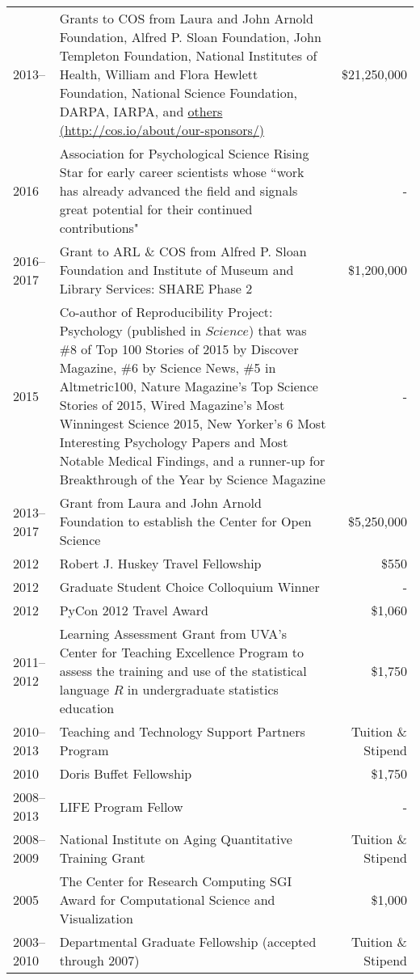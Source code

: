 \documentclass[11pt]{article}
\begin{document}
\begin{tabularx}{\textwidth}{lXr}
2013-- 			& Grants to COS from Laura and John Arnold Foundation, Alfred P. Sloan Foundation, John Templeton Foundation, National Institutes of Health, William and Flora Hewlett Foundation, National Science Foundation, DARPA, IARPA, and \href{http://cos.io/about/our-sponsors/}{others (http://cos.io/about/our-sponsors/)} & \$21,250,000 \\
2016			& Association for Psychological Science Rising Star for early career scientists whose ``work has already advanced the field and signals great potential for their continued contributions" & - \\
2016--2017		& Grant to ARL \& COS from Alfred P. Sloan Foundation and Institute of Museum and Library Services: SHARE Phase 2 & \$1,200,000 \\
2015 			& Co-author of Reproducibility Project: Psychology (published in $Science$) that was \#8 of Top 100 Stories of 2015 by Discover Magazine, \#6 by Science News, \#5 in Altmetric100, Nature Magazine’s Top Science Stories of 2015,  Wired Magazine’s Most Winningest Science 2015, New Yorker’s 6 Most Interesting Psychology Papers and Most Notable Medical Findings, and a runner-up for Breakthrough of the Year by Science Magazine & - \\
2013--2017  	& Grant from Laura and John Arnold Foundation to establish the Center for Open Science & \$5,250,000 \\
2012        		& Robert J. Huskey Travel Fellowship  & \$550 \\
2012        		& Graduate Student Choice Colloquium Winner  & - \\
2012        		& PyCon 2012 Travel Award & \$1,060\\
2011--2012  	& Learning Assessment Grant from UVA's Center for Teaching Excellence Program to assess the training and use of the statistical language $R$ in undergraduate statistics education & \$1,750\\
2010--2013		& Teaching and Technology Support Partners Program & Tuition \& Stipend \\
2010       		& Doris Buffet Fellowship & \$1,750 \\
2008--2013 	& LIFE Program Fellow & - \\
2008--2009  	& National Institute on Aging Quantitative Training Grant & Tuition \& Stipend \\
2005 				& The Center for Research Computing SGI Award for Computational Science and Visualization & \$1,000 \\
2003--2010  	& Departmental Graduate Fellowship (accepted through 2007)  & Tuition \& Stipend \\
\end{tabularx}
\end{document}
